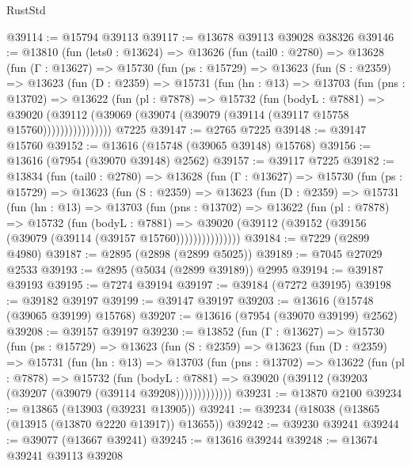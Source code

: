 \begin{lexlean}{RustStd}
\begin{coremodule}
@39114 := @15794 @39113
@39117 := @13678 @39113 @39028 @38326
@39146 := @13810
    (fun (lets0 : @13624) =>
    @13626
      (fun (tail0 : @2780) =>
      @13628
        (fun (Γ : @13627) =>
        @15730
          (fun (ps : @15729) =>
          @13623
            (fun (S : @2359) =>
            @13623
              (fun (D : @2359) =>
              @15731
                (fun (hn : @13) =>
                @13703
                  (fun (pns : @13702) =>
                  @13622
                    (fun (pl : @7878) =>
                    @15732
                      (fun (bodyL : @7881) =>
                      @39020
                        (@39112
                          (@39069 (@39074 (@39079 (@39114 (@39117 @15758 @15760))))))))))))))))
    @7225
@39147 := @2765 @7225
@39148 := @39147 @15760
@39152 := @13616 (@15748 (@39065 @39148) @15768)
@39156 := @13616 (@7954 (@39070 @39148) @2562)
@39157 := @39117 @7225
@39182 := @13834
    (fun (tail0 : @2780) =>
    @13628
      (fun (Γ : @13627) =>
      @15730
        (fun (ps : @15729) =>
        @13623
          (fun (S : @2359) =>
          @13623
            (fun (D : @2359) =>
            @15731
              (fun (hn : @13) =>
              @13703
                (fun (pns : @13702) =>
                @13622
                  (fun (pl : @7878) =>
                  @15732
                    (fun (bodyL : @7881) =>
                    @39020 (@39112 (@39152 (@39156 (@39079 (@39114 (@39157 @15760)))))))))))))))
@39184 := @7229 (@2899 @4980)
@39187 := @2895 (@2898 (@2899 @5025))
@39189 := @7045 @27029 @2533
@39193 := @2895 (@5034 (@2899 @39189)) @2995
@39194 := @39187 @39193
@39195 := @7274 @39194
@39197 := @39184 (@7272 @39195)
@39198 := @39182 @39197
@39199 := @39147 @39197
@39203 := @13616 (@15748 (@39065 @39199) @15768)
@39207 := @13616 (@7954 (@39070 @39199) @2562)
@39208 := @39157 @39197
@39230 := @13852
    (fun (Γ : @13627) =>
    @15730
      (fun (ps : @15729) =>
      @13623
        (fun (S : @2359) =>
        @13623
          (fun (D : @2359) =>
          @15731
            (fun (hn : @13) =>
            @13703
              (fun (pns : @13702) =>
              @13622
                (fun (pl : @7878) =>
                @15732
                  (fun (bodyL : @7881) =>
                  @39020 (@39112 (@39203 (@39207 (@39079 (@39114 @39208)))))))))))))
@39231 := @13870 @2100
@39234 := @13865 (@13903 (@39231 @13905))
@39241 := @39234 (@18038 (@13865 (@13915 (@13870 @2220 @13917)) @13655))
@39242 := @39230 @39241
@39244 := @39077 (@13667 @39241)
@39245 := @13616 @39244
@39248 := @13674 @39241 @39113 @39208

\end{coremodule}
\end{lexlean}
